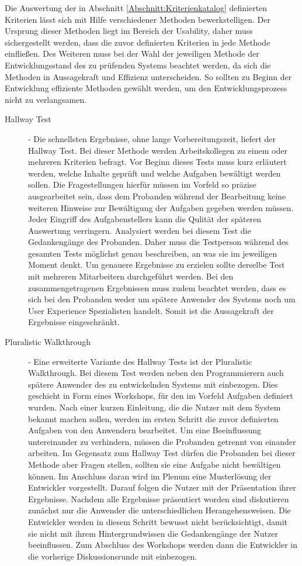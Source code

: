 Die Auswertung der in Abschnitt \ref{Abschnitt:Kriterienkatalog} definierten Kriterien lässt sich mit Hilfe verschiedener Methoden bewerkstelligen. Der Ursprung dieser Methoden liegt im Bereich der Usability, daher muss sichergestellt werden, dass die zuvor definierten Kriterien in jede Methode einfließen. Des Weiteren muss bei der Wahl der jeweiligen Methode der Entwicklungsstand des zu prüfenden Systems beachtet werden, da sich die Methoden in Aussagekraft und Effizienz unterscheiden. So sollten zu Beginn der Entwicklung effiziente Methoden gewählt werden, um den Entwicklungsprozess nicht zu verlangsamen. \cite[S. 224]{Moser:2012cn}
\begin{description} 
\item[Hallway Test] 
 - Die schnellsten Ergebnisse, ohne lange Vorbereitungszeit, liefert der Hallway Test. Bei dieser Methode werden Arbeitskollegen zu einem oder mehreren Kriterien befragt. Vor Beginn dieses Tests muss kurz erläutert werden, welche Inhalte geprüft und welche Aufgaben bewältigt werden sollen. Die Fragestellungen hierfür müssen im Vorfeld so präzise ausgearbeitet sein, dass dem Probanden während der Bearbeitung keine weiteren Hinweise zur Bewältigung der Aufgaben gegeben werden müssen. Jeder Eingriff des Aufgabenstellers kann die Qulität der späteren Auswertung verringern. Analysiert werden bei diesem Test die Gedankengänge des Probanden. Daher muss die Testperson während des gesamten Tests möglichst genau beschreiben, an was sie im jeweiligen Moment denkt. Um genauere Ergebnisse zu erzielen sollte derselbe Test mit mehreren Mitarbeitern durchgeführt werden. Bei den zusammengetragenen Ergebnissen muss zudem beachtet werden, dass es sich bei den Probanden weder um spätere Anwender des Systems noch um User Experience Spezialisten handelt. Somit ist die Aussagekraft der Ergebnisse eingeschränkt. \cite[S. 226]{Moser:2012cn}
\item[Pluralistic Walkthrough] 
 - Eine erweiterte Variante des Hallway Tests ist der Pluralistic Walkthrough. Bei diesem Test werden neben den Programmierern auch spätere Anwender des zu entwickelnden Systems mit einbezogen. Dies geschieht in Form eines Workshops, für den im Vorfeld Aufgaben definiert wurden. Nach einer kurzen Einleitung, die die Nutzer mit dem System bekannt machen sollen, werden im ersten Schritt die zuvor definierten Aufgaben von den Anwendern bearbeitet. Um eine Beeinflussung untereinander zu verhindern, müssen die Probanden getrennt von einander arbeiten. Im Gegensatz zum Hallway Test dürfen die Probanden bei dieser Methode aber Fragen stellen, sollten sie eine Aufgabe nicht bewältigen können. Im Anschluss daran wird im Plenum eine Musterlösung der Entwickler vorgestellt. Darauf folgen die Nutzer mit der Präsentation ihrer Ergebnisse. Nachdem alle Ergebnisse präsentiert worden sind diskutieren zunächst nur die Anwender die unterschiedlichen Herangehensweisen. Die Entwickler werden in diesem Schritt bewusst nicht berücksichtigt, damit sie nicht mit ihrem Hintergrundwissen die Gedankengänge der Nutzer beeinflussen. Zum Abschluss des Workshops werden dann die Entwickler in die vorherige Diskussionsrunde mit einbezogen. \cite[S. 228f.]{Moser:2012cn}

\end{description}
